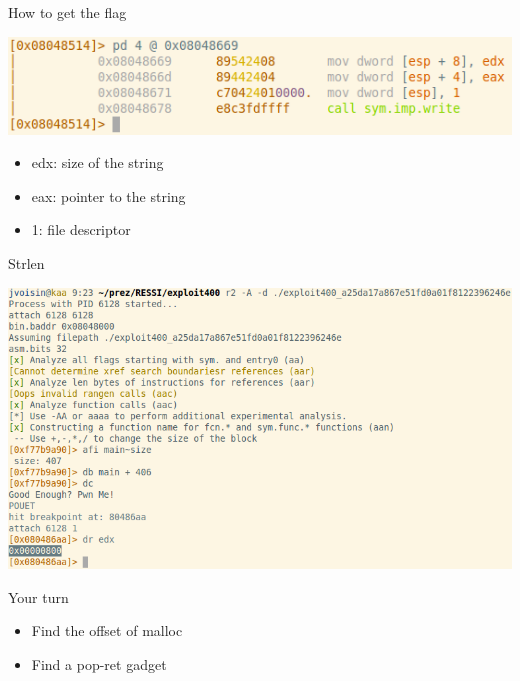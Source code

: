 \documentclass{beamer}
\begin{document}
\begin{frame}{How to get the flag}
    \begin{center}
        \includegraphics[width=\textwidth]{exp400_write.png}
        \begin{itemize}
            \item \alert{edx}: size of the string
            \item \alert{eax}: pointer to the string
            \item \alert{1}: file descriptor
        \end{itemize}
    \end{center}
\end{frame}

\begin{frame}{Strlen}
    \begin{center}
        \includegraphics[width=\textwidth]{exp400_edx.png}
    \end{center}
\end{frame}

\begin{frame}{Your turn}
    \begin{center}
        \Large
        \begin{itemize}
            \item Find the offset of \alert{malloc}
            \item Find a \alert{pop-ret} gadget
        \end{itemize}
    \end{center}
\end{frame}
\end{document}

